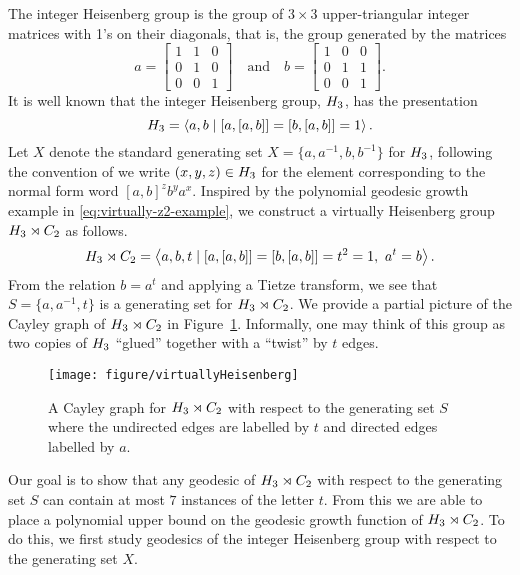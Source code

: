 The integer Heisenberg group is the group of $3 \times 3$ upper-triangular integer matrices with 1's on their diagonals, that is, the group generated by the matrices
\[
	a
	=
	\begin{bmatrix}
		1 & 1 & 0\\
		0 & 1 & 0\\
		0 & 0 & 1
	\end{bmatrix}
	\quad\text{and}\quad
	b
	=
	\begin{bmatrix}
		1 & 0 & 0\\
		0 & 1 & 1\\
		0 & 0 & 1
	\end{bmatrix}.
\]
It is well known that the integer Heisenberg group, $H_3$, has the presentation
\[
	H_3 =
	\left\langle
		a,b
	\mid
		[a,[a,b]] = [b,[a,b]] = 1
	\right\rangle.
\]
Let $X$ denote the standard generating set $X = \{a,a^{-1},b,b^{-1}\}$ for $H_3$, following the convention of \textcite{blachere2003} we write $(x,y,z) \in H_3$ for the element corresponding to the normal form word $[a,b]^z b^y a^x$.
Inspired by the polynomial geodesic growth example in \cref{eq:virtually-z2-example}, we construct a virtually Heisenberg group $H_3 \rtimes C_2$ as follows.
\begin{equation}\label{eq:presentation-1}
	H_3 \rtimes C_2 =
	\left\langle
		a,b,t
	\mid
		[a,[a,b]] = [b,[a,b]] = t^2 = 1,\ a^t = b
	\right\rangle.
\end{equation}
From the relation $b = a^t$ and applying a Tietze transform, we see that $S = \{a,a^{-1},t\}$ is a generating set for $H_3 \rtimes C_2$.
We provide a partial picture of the Cayley graph of $H_3 \rtimes C_2$ in Figure~\ref{fig:HeisCG}. Informally, one may think of this group as two copies of $H_3$ ``glued'' together with a ``twist'' by $t$ edges.

\begin{figure}[!ht]
	\centering
	\texttt{[image: figure/virtuallyHeisenberg]}
	\caption{A Cayley graph for $H_3 \rtimes C_2$ with respect to the generating set $S$ where the undirected edges are labelled by $t$ and directed edges labelled by $a$.}\label{fig:HeisCG}
\end{figure}

Our goal is to show that any geodesic of $H_3 \rtimes C_2$ with respect to the generating set $S$ can contain at most $7$ instances of the letter $t$.
From this we are able to place a polynomial upper bound on the geodesic growth function of $H_3 \rtimes C_2$.
To do this, we first study geodesics of the integer Heisenberg group with respect to the generating set $X$.

